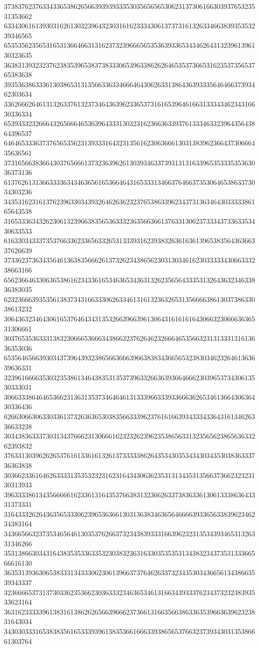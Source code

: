 37383762376334336538626566393939333530356565653062313730616630393765323531353662
63343061613930316261303239643230316162333430613737316132633466383935353239346565
65353562356531653136646631316237323966656535363933653434626431323961396130323635
36383139323237623835396538373833306539633862626465353736653162353735653765383638
39353638633361303865313135663363346664643062633138643639333564646637393462303634
33626662646131326337613237346436396233653731616539646166313334346234316630336334
65393332326664326566646536396433313032316236636339376133346332396435643864396537
64646533363737656535623139333164323135616230636661303138396236643730666435636561
37316566383664303765666137323639626130393463373931313163396535333535363036373136
61376261313663333634346365616536646431653331346637646637353064653863373034303236
34353162316137623963303439326462636232376538633962343731363464303333386165643538
31653336343262306132396638356536333236356636613763313062373334373363353430633533
61633034333735376633623365633265313339316239383263616361396538356436366337626639
37336237363435646136383566626137326234386562303130346162303333343066333238663166
65623664633063653861623433616534636534363132623565643335313264363234633836383035
62323666393535613837343166333062633461316132363265313566663861303738633038613232
30643632346430616537646434313532663966396130643161616164306632306663636531306661
30376535363331383230666536663438663237626462326664653566323131333131613636353036
65356465663930343739643932386566366639663838343665653238303462326461363639636331
32396166663530323538613464383531353739633266363936646662303965373430613530333031
30663338646465366231363135373464646131333966333933666362653461366430636430336436
62663066306330336137326363653038356633396237616166393433343364316134626336633238
30343836333730313437666231306661623232623962353865633132356562386563633262393832
37633130396262653761613361613261373333386264353430353434303435303836333736363838
30366233616462633331353532323162316434306362353131343531356637366232323130313933
39633338613435666661623361316435376638313236626337383633613061333863643331373331
31643332626436356533306239653636613031363834636564666639336563383962346234383164
34366566323735346564613035376266373234383933316639623231353439346531326331346266
35313866303431643835353363353230383236316330353535313438323437353133366566616130
36353139363065383331343330623061396637376462633732343530343665613438663539343337
32366665373137303362353662303633323463653461316634393337623437323238393533623164
36316233333961383161386262656639666237366131663566386336353966363962323831643034
34303033316538383561653339396138353661666339386565376632373934303135386661303764
